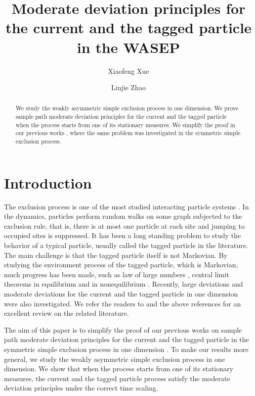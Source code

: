 \documentclass[reqno,11pt]{amsart}
\title[Moderate deviation principles]{Moderate deviation principles for the current and the tagged particle in the WASEP}
\author{Xiaofeng Xue}
\author{Linjie Zhao}
\numberwithin{equation}{section}
\begin{document}
	
	\begin{abstract}
		We study the weakly asymmetric simple exclusion process in one dimension. We prove  sample path moderate deviation principles for the current and the tagged particle  when the process starts from one of its stationary measures. We simplify the proof in our previous works \cite{xue2023moderate,xue2024sample}, where the same problem was investigated in the symmetric simple exclusion process. 
	\end{abstract}



\maketitle

\section{Introduction}

The exclusion process is one of the most studied interacting particle systems \cite{liggettips,liggett99}. In the dynamics, particles perform random walks on some graph subjected to the exclusion rule, that is, there is at most one particle at each site and jumping to occupied sites is suppressed.  It has been a long standing problem to study the behavior of a typical particle, usually called the tagged particle in the literature. The main challenge is that the tagged particle itself is not Markovian. By studying the environment process of the tagged particle, which is Markovian, much progress has been made, such as  law of large numbers \cite{saada1987tagged,rezakhanlou1994evolution}, central limit  theorems in equilibrium \cite{kipnis1986central,varadhan1995self,Kipnis86,sethuraman2000diffusive,sethuraman2006diffusive,zhao2023motion} and in nonequilibrium \cite{jara2008quenched,jara2006nonequilibrium,jara2009nonequilibrium}. Recently, large deviations \cite{sethuraman2013large,sethuraman2023atypical} and moderate deviations \cite{xue2023moderate,xue2024sample} for the current and the tagged particle in one dimension were also investigated. We refer the readers to \cite{komorowski2012fluctuations} and the above references for an excellent review on the related literature.

The aim of this paper is to simplify the proof of our previous works on sample path moderate deviation principles for the current and the tagged particle in the symmetric simple exclusion process in one dimension \cite{xue2023moderate,xue2024sample}.  To make our results more general, we study the weakly asymmetric simple exclusion process in one dimension. We show that when the process starts from one of its stationary measures, the current and the tagged particle process satisfy the moderate deviation principles under the correct time scaling.
\end{document}
